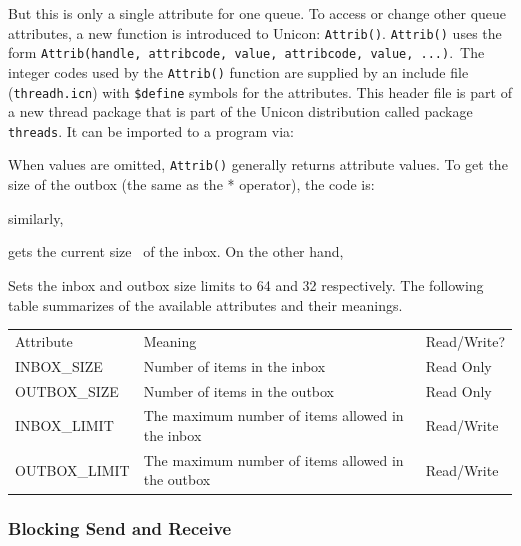 
But this is only a single attribute for one queue. To access or change
other queue attributes, a new function is introduced to Unicon:
\texttt{Attrib()}. \texttt{Attrib()}
uses the form \texttt{Attrib(handle, attribcode, value,
attribcode, value, ...)}.~The integer codes used by the
\texttt{Attrib()} function are supplied by an include
file (\texttt{threadh.icn}) with
\texttt{\$define} symbols for the attributes. This
header file is part of a new thread package that is part of the Unicon
distribution called package \texttt{threads}. It can be
imported to a program via:


When values are omitted, \texttt{Attrib()} generally
returns attribute values. To get the size of the outbox (the same as
the * operator), the code is:


\noindent similarly, 


gets the current size \ of the inbox. On the other hand, 


Sets the inbox and outbox size limits to 64 and 32 respectively. The
following table summarizes of the available attributes and their
meanings.


\bigskip

\begin{flushleft}
\tablehead{}
\begin{supertabular}{m{2.0941598in}m{1.9087598in}m{1.9108598in}}
Attribute &
Meaning &
Read/Write?\\
INBOX\_SIZE &
Number of items in the inbox &
Read Only\\
OUTBOX\_SIZE &
Number of items in the outbox &
Read Only\\
INBOX\_LIMIT &
The maximum number of items allowed in the inbox &
Read/Write\\
OUTBOX\_LIMIT &
The maximum number of items allowed in the outbox &
Read/Write\\
\end{supertabular}
\end{flushleft}

\bigskip


\bigskip

\subsubsection{Blocking Send and Receive}

